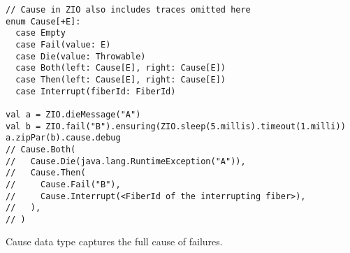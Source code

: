 \begin{algorithm}

\begin{verbatim}
// Cause in ZIO also includes traces omitted here
enum Cause[+E]:
  case Empty
  case Fail(value: E)
  case Die(value: Throwable)
  case Both(left: Cause[E], right: Cause[E])
  case Then(left: Cause[E], right: Cause[E])
  case Interrupt(fiberId: FiberId)

val a = ZIO.dieMessage("A")
val b = ZIO.fail("B").ensuring(ZIO.sleep(5.millis).timeout(1.milli))
a.zipPar(b).cause.debug
// Cause.Both(
//   Cause.Die(java.lang.RuntimeException("A")),
//   Cause.Then(
//     Cause.Fail("B"),
//     Cause.Interrupt(<FiberId of the interrupting fiber>),
//   ),
// )
\end{verbatim}

\caption{Cause data type captures the full cause of failures. \label{zio:cause}}
\end{algorithm}